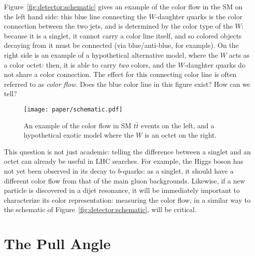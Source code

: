 Figure~\ref{fig:detector:schematic} gives an example of the color flow in the SM on the left hand side: this blue line connecting the $W$-daughter quarks is the color connection between the two jets, and is determined by the color type of the $W$: because it is a singlet, it cannot carry a color line itself, and so colored objects decaying from it must be connected (via blue/anti-blue, for example). On the right side is an example of a hypothetical alternative model, where the $W$ acts as a color octet: then, it is able to carry \textit{two} colors, and the $W$-daughter quarks do not share a color connection. The effect for this connecting color line is often referred to as \textit{color flow}. Does the blue color line in this figure exist? How can we tell?


\begin{figure}
\centering
\texttt{[image: paper/schematic.pdf]}
\label{fig:color:motivation:schematic}
\caption{An example of the color flow in SM $t\bar{t}$ events on the left, and a hypothetical exotic model where the $W$ is an octet on the right.}
\end{figure}


This question is not just academic: telling the difference between a singlet and an octet can already be useful in LHC searches. For example, the Higgs boson has not yet been observed in its decay to $b$-quarks: as a singlet, it should have a different color flow from that of the main gluon backgrounds. Likewise, if a new particle is discovered in a dijet resonance, it will be immediately important to characterize its color representation: measuring the color flow, in a similar way to the schematic of Figure~\ref{fig:detector:schematic}, will be critical. 

\section{The Pull Angle}

